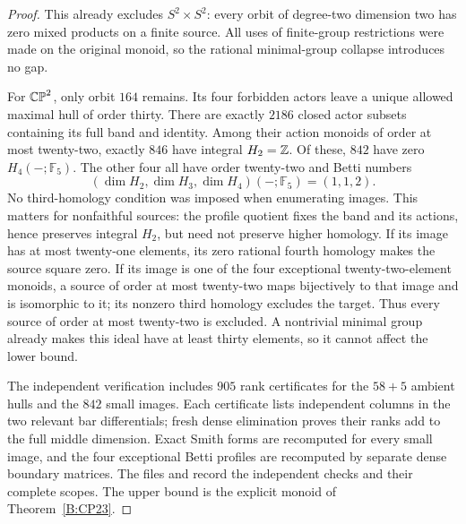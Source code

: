 \begin{proof}
This already excludes $S^2\times S^2$: every orbit of degree-two
dimension two has zero mixed products on a finite source.
All uses of finite-group restrictions were made on the original
monoid, so the rational minimal-group collapse introduces no gap.

For $\mathbb {CP}^2$, only orbit $164$ remains.  Its four forbidden actors
leave a unique allowed maximal hull of order thirty.  There are exactly
$2186$ closed actor subsets containing its full band and identity.
Among their action monoids of order at most twenty-two, exactly $846$
have integral $H_2=\mathbb Z$.  Of these, $842$ have zero
$H_4(-;\mathbb F_5)$.  The other four all have order twenty-two
and Betti numbers
\[
 (\dim H_2,\dim H_3,\dim H_4)(-;\mathbb F_5)=(1,1,2).
\]
No third-homology condition was imposed when enumerating images.
This matters for nonfaithful sources: the profile quotient fixes the
band and its actions, hence preserves integral $H_2$, but need not
preserve higher homology.  If its image has at most twenty-one
elements, its zero rational fourth homology makes the source square
zero.  If its image is one of the four exceptional twenty-two-element
monoids, a source of order at most twenty-two maps bijectively to that
image and is isomorphic to it; its nonzero third homology excludes the
target.  Thus every source of order at most twenty-two is excluded.
A nontrivial minimal group already makes this ideal have at least
thirty elements, so it cannot affect the lower bound.

The independent verification includes $905$ rank certificates for
the $58+5$ ambient hulls and the $842$ small images.  Each certificate
lists independent columns in the two relevant bar differentials;
fresh dense elimination proves their ranks add to the full middle
dimension.  Exact Smith forms are recomputed for every small image,
and the four exceptional Betti profiles are recomputed by separate
dense boundary matrices.  The files
 and
record the independent checks and their complete scopes.
The upper bound is the explicit monoid of Theorem~\ref{B:CP23}.
\end{proof}
